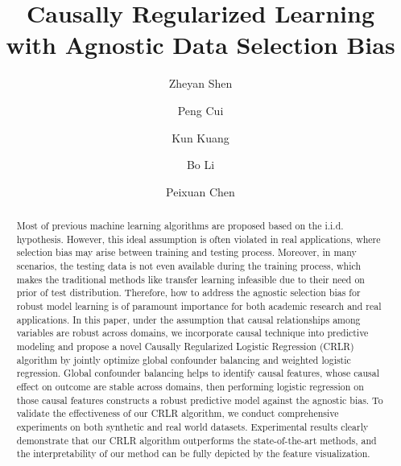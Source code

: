 \documentclass[sigconf]{acmart}
\begin{document}
\title{Causally Regularized Learning with Agnostic Data Selection Bias}

\author{Zheyan Shen}

\author{Peng Cui}

\author{Kun Kuang}

\author{Bo Li}

\author{Peixuan Chen}

\renewcommand{\shortauthors}{Z. Shen et al.}

\begin{abstract}
Most of previous machine learning algorithms are proposed based on the i.i.d. hypothesis. 
However, this ideal assumption is often violated in real applications, where selection bias may arise between training and testing process. 
Moreover, in many scenarios, the testing data is not even available during the training process, which makes the traditional methods like transfer learning infeasible due to their need on prior of test distribution. 
Therefore, how to address the agnostic selection bias for robust model learning is of paramount importance for both academic research and real applications. 
In this paper, under the assumption that causal relationships among variables are robust across domains, we incorporate causal technique into predictive modeling and propose a novel Causally Regularized Logistic Regression (CRLR) algorithm by jointly optimize global confounder balancing and weighted logistic regression.
Global confounder balancing helps to identify causal features, whose causal effect on outcome are stable across domains, then performing logistic regression on those causal features constructs a robust predictive model against the agnostic bias.
To validate the effectiveness of our CRLR algorithm, we conduct comprehensive experiments on both synthetic and real world datasets.
Experimental results clearly demonstrate that our CRLR algorithm outperforms the state-of-the-art methods, and the interpretability of our method can be fully depicted by the feature visualization.
\end{abstract}
\end{document}
